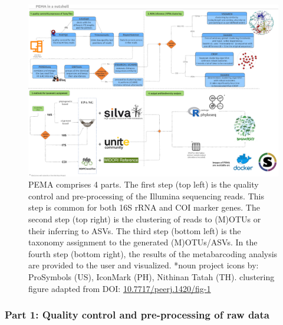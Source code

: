    \begin{figure}[h]
      \centering
      \includegraphics[width=0.95\columnwidth]{figures/pema_workflow.jpeg}
      \caption[PEMA in a nutshell]{PEMA comprises 4 parts. The first step (top left) is the quality control and pre-processing of the Illumina sequencing reads. This step is common for both 16S rRNA and COI marker genes. The second step (top right) is the clustering of reads to (M)OTUs or their inferring to ASVs. The third step (bottom left) is the taxonomy assignment to the generated (M)OTUs/ASVs. In the fourth step (bottom right), the results of the metabarcoding analysis are provided to the user and visualized. *noun project icons by: ProSymbols (US), IconMark (PH), Nithinan Tatah (TH). clustering figure adapted from 
      DOI: \href{https://peerj.com/articles/1420/\#fig-1}{10.7717/peerj.1420/fig-1}}
      \label{fig:pema-nutshell}
   \end{figure}


   \subsubsection*{Part 1: Quality control and pre-processing of raw data}

